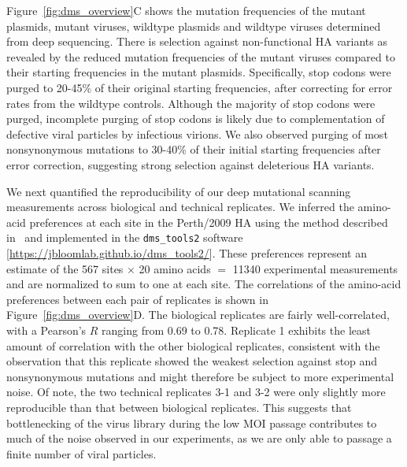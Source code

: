 \documentclass[11pt]{article}
\begin{document}
Figure~\ref{fig:dms_overview}C shows the mutation frequencies of the mutant plasmids, mutant viruses, wildtype plasmids and wildtype viruses determined from deep sequencing. 
There is selection against non-functional HA variants as revealed by the reduced mutation frequencies of the mutant viruses compared to their starting frequencies in the mutant plasmids.
Specifically, stop codons were purged to 20-45\% of their original starting frequencies, after correcting for error rates from the wildtype controls.
Although the majority of stop codons were purged, incomplete purging of stop codons is likely due to complementation of defective viral particles by infectious virions. 
We also observed purging of most nonsynonymous mutations to 30-40\% of their initial starting frequencies after error correction, suggesting strong selection against deleterious HA variants.

We next quantified the reproducibility of our deep mutational scanning measurements across biological and technical replicates. 
We inferred the amino-acid preferences at each site in the Perth/2009 HA using the method described in~\cite{bloom2015software} and implemented in the \texttt{dms\_tools2} software [\url{https://jbloomlab.github.io/dms_tools2/}].
These preferences represent an estimate of the 567 sites $\times$ 20 amino acids $=$ 11340 experimental measurements and are normalized to sum to one at each site.
The correlations of the amino-acid preferences between each pair of replicates is shown in Figure~\ref{fig:dms_overview}D.
The biological replicates are fairly well-correlated, with a Pearson's $R$ ranging from 0.69 to 0.78. 
Replicate 1 exhibits the least amount of correlation with the other biological replicates, consistent with the observation that this replicate showed the weakest selection against stop and nonsynonymous mutations and might therefore be subject to more experimental noise.
Of note, the two technical replicates 3-1 and 3-2 were only slightly more reproducible than that between biological replicates.
This suggests that bottlenecking of the virus library during the low MOI passage contributes to much of the noise observed in our experiments, as we are only able to passage a finite number of viral particles.
\end{document}
